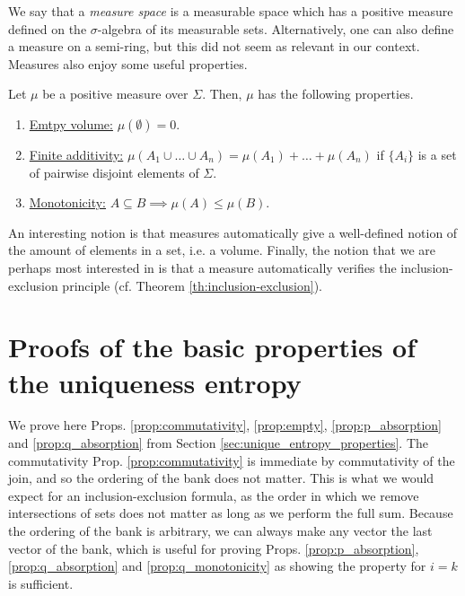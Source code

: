 We say that a \textit{measure space} is a measurable space which has a positive measure defined on the $\sigma$-algebra of its measurable sets. Alternatively, one can also define a measure on a semi-ring, but this did not seem as relevant in our context. Measures also enjoy some useful properties.

\begin{appendix_theorem} \label{th:measure_properties}
    Let $\mu$ be a positive measure over $\Sigma$. Then, $\mu$ has the following properties.
    \begin{enumerate}
        \item \underline{Emtpy volume:} $\mu(\emptyset) = 0$.
        \item \underline{Finite additivity:} $\mu(A_1 \cup \dots \cup A_n) = \mu(A_1) + \dots + \mu(A_n)$ if $\{A_i\}$ is a set of pairwise disjoint elements of $\Sigma$.
        \item \underline{Monotonicity:} $A \subseteq B \implies \mu(A) \leq \mu(B)$.
    \end{enumerate}
\end{appendix_theorem}

An interesting notion is that measures automatically give a well-defined notion of the amount of elements in a set, i.e. a volume. Finally, the notion that we are perhaps most interested in is that a measure automatically verifies the inclusion-exclusion principle (cf. Theorem \ref{th:inclusion-exclusion}).



\newpage

\section{Proofs of the basic properties of the uniqueness entropy} \label{app:unique_entropy_properties}

\setcounter{equation}{0}

We prove here Props. \ref{prop:commutativity}, \ref{prop:empty}, \ref{prop:p_absorption} and \ref{prop:q_absorption} from Section \ref{sec:unique_entropy_properties}. The commutativity Prop. \ref{prop:commutativity} is immediate by commutativity of the join, and so the ordering of the bank does not matter. This is what we would expect for an inclusion-exclusion formula, as the order in which we remove intersections of sets does not matter as long as we perform the full sum. Because the ordering of the bank is arbitrary, we can always make any vector the last vector of the bank, which is useful for proving Props. \ref{prop:p_absorption}, \ref{prop:q_absorption} and \ref{prop:q_monotonicity} as showing the property for $i = k$ is sufficient.

